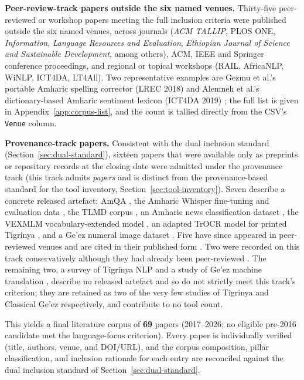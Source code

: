 \documentclass[sn-mathphys-num]{sn-jnl}
\theoremstyle{thmstyleone}
\theoremstyle{thmstyletwo}
\theoremstyle{thmstylethree}
\begin{document}
\textbf{Peer-review-track papers outside the six named venues.} Thirty-five peer-reviewed or workshop papers meeting the full inclusion criteria were published outside the six named venues, across journals (\emph{ACM TALLIP}, PLOS ONE, \emph{Information}, \emph{Language Resources and Evaluation}, \emph{Ethiopian Journal of Science and Sustainable Development}, among others), ACM, IEEE and Springer conference proceedings, and regional or topical workshops (RAIL, AfricaNLP, WiNLP, ICT4DA, LT4All). Two representative examples are Gezmu et al.'s portable Amharic spelling corrector (LREC 2018) \citep{gezmu_portable_2018} and Alemneh et al.'s dictionary-based Amharic sentiment lexicon (ICT4DA 2019) \citep{alemneh_dictionary_2019}; the full list is given in Appendix~\ref{app:corpus-list}, and the count is tallied directly from the CSV's \texttt{Venue} column.

\textbf{Provenance-track papers.} Consistent with the dual inclusion standard (Section~\ref{sec:dual-standard}), sixteen papers that were available only as preprints or repository records at the closing date were admitted under the provenance track (this track admits \emph{papers} and is distinct from the provenance-based standard for the tool inventory, Section~\ref{sec:tool-inventory}). Seven describe a concrete released artefact: AmQA \citep{abedissa_amqa_2023}, the Amharic Whisper fine-tuning and evaluation data \citep{gete_whispering_2025}, the TLMD corpus \citep{gaim_tlmd_2021}, an Amharic news classification dataset \citep{azime_amharic_2021}, the VEXMLM vocabulary-extended model \citep{teklehaymanot_expanding_2026}, an adapted TrOCR model for printed Tigrinya \citep{medhanie_adapting_2026}, and a Ge'ez numeral image dataset \citep{beyene_handwritten_2019}. Five have since appeared in peer-reviewed venues and are cited in their published form \citep{teklehaymanot_lowresource_2025,yimer_learning_2024,gashaw_amharicarabic_2019,gondere_handwritten_2019,adnew_semantically_2024}. Two were recorded on this track conservatively although they had already been peer-reviewed \citep{yimam_introducing_2021,kidane_exploration_2021}. The remaining two, a survey of Tigrinya NLP \citep{gaim_tigrinya_2025} and a study of Ge'ez machine translation \citep{wassie_machine_2023}, describe no released artefact and so do not strictly meet this track's criterion; they are retained as two of the very few studies of Tigrinya and Classical Ge'ez respectively, and contribute to no tool count.

This yields a final literature corpus of \textbf{69} papers (2017--2026; no eligible pre-2016 candidate met the language-focus criterion). Every paper is individually verified (title, authors, venue, and DOI/URL), and the corpus composition, pillar classification, and inclusion rationale for each entry are reconciled against the dual inclusion standard of Section~\ref{sec:dual-standard}.
\end{document}
